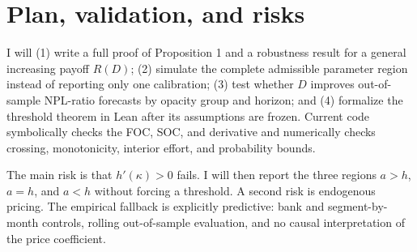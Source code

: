 \documentclass[11pt]{article}
\begin{document}
\section{Plan, validation, and risks}

I will (1) write a full proof of Proposition 1 and a robustness result for a
general increasing payoff \(R(D)\); (2) simulate the complete admissible
parameter region instead of reporting only one calibration; (3) test whether
\(D\) improves out-of-sample NPL-ratio forecasts by opacity group and horizon;
and (4) formalize the threshold theorem in Lean after its assumptions are
frozen. Current code symbolically checks the FOC, SOC, and derivative and
numerically checks crossing, monotonicity, interior effort, and probability
bounds.

The main risk is that \(h'(\kappa)>0\) fails. I will then report the three
regions \(a>h\), \(a=h\), and \(a<h\) without forcing a threshold. A second
risk is endogenous pricing. The empirical fallback is explicitly predictive:
bank and segment-by-month controls, rolling out-of-sample evaluation, and no
causal interpretation of the price coefficient.

\small


\end{document}
